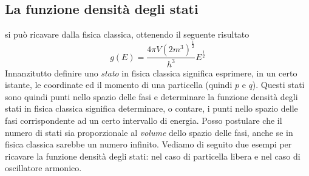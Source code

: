 \subsection{La funzione densità degli stati}
si può ricavare dalla fisica classica, ottenendo il seguente risultato
\begin{equation} 
g(E) = \frac{4 \pi V (2m^3)^{ \frac{1}{2} }}{h^3} E^{ \frac{1}{2} }
\label{dens_stati}
\end{equation}
Innanzitutto definire uno \textit{stato} in fisica classica significa esprimere, in un certo istante, le coordinate ed il momento di una particella (quindi $p$ e $q$). 
Questi stati sono quindi punti nello spazio delle fasi e determinare la funzione densità degli stati in fisica classica significa determinare, o contare, i punti nello spazio delle fasi corrispondente ad un certo intervallo di energia.
Posso postulare che il numero di stati sia proporzionale al \textit{volume} dello spazio delle fasi, anche se in fisica classica sarebbe un numero infinito.
Vediamo di seguito due esempi per ricavare la funzione densità degli stati: nel caso di particella libera e nel caso di oscillatore armonico.

